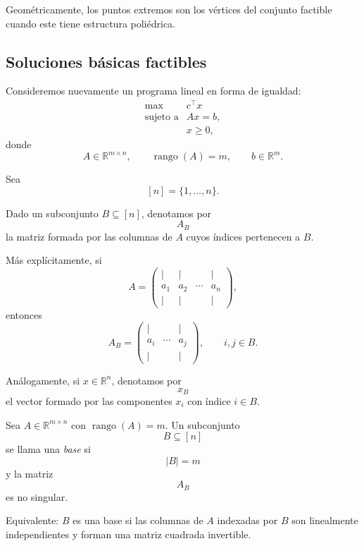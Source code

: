 Geométricamente, los puntos extremos son los vértices del conjunto factible cuando este tiene estructura poliédrica.

\subsection{Soluciones básicas factibles}

Consideremos nuevamente un programa lineal en forma de igualdad:
\[
    \begin{array}{ll}
        \max & c^\top x\\[1mm]
        \text{sujeto a} & Ax=b,\\
        & x\geq 0,
    \end{array}
\]
donde
\[
    A\in\mathbb{R}^{m\times n},
    \qquad
    \operatorname{rango}(A)=m,
    \qquad
    b\in\mathbb{R}^m.
\]

Sea
\[
    [n]=\{1,\dots,n\}.
\]

Dado un subconjunto \(B\subseteq[n]\), denotamos por
\[
    A_B
\]
la matriz formada por las columnas de \(A\) cuyos índices pertenecen a \(B\).

Más explícitamente, si
\[
    A=
    \begin{pmatrix}
        \vert & \vert & & \vert\\
        a_1 & a_2 & \cdots & a_n\\
        \vert & \vert & & \vert
    \end{pmatrix},
\]
entonces
\[
    A_B
    =
    \begin{pmatrix}
        \vert & & \vert\\
        a_i & \cdots & a_j\\
        \vert & & \vert
    \end{pmatrix},
    \qquad i,j\in B.
\]

Análogamente, si \(x\in\mathbb{R}^n\), denotamos por
\[
    x_B
\]
el vector formado por las componentes \(x_i\) con índice \(i\in B\).

\begin{definition}[Base]
Sea \(A\in\mathbb{R}^{m\times n}\) con \(\operatorname{rango}(A)=m\). Un subconjunto
\[
    B\subseteq[n]
\]
se llama una \emph{base} si
\[
    |B|=m
\]
y la matriz
\[
    A_B
\]
es no singular.

Equivalente: \(B\) es una base si las columnas de \(A\) indexadas por \(B\) son linealmente independientes y forman una matriz cuadrada invertible.
\end{definition}

